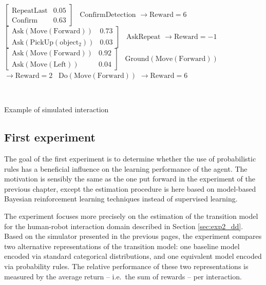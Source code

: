 \begin{Transcript}[p!]
\begin{normalsize}
\begin{dialogue}
 $\begin{bmatrix}\mathrm{RepeatLast} & 0.05 \\ \mathrm{Confirm} & 0.63 \end{bmatrix}$ \vspace{3mm}
 \ $\mathrm{ConfirmDetection}$ \hspace{34mm} $\rightarrow \mathrm{Reward} = 6$ \vspace{3mm}
 $\begin{bmatrix}\mathrm{Ask(Move(Forward))} & 0.73 \\
\mathrm{Ask(PickUp(object_2))}& 0.03 \end{bmatrix}$ \vspace{3mm}
 \ $\mathrm{AskRepeat}$ \hspace{47mm} $\rightarrow \mathrm{Reward} = -1$ \vspace{3mm}
 $\begin{bmatrix}\mathrm{Ask(Move(Forward))} & 0.92 \\
\mathrm{Ask(Move(Left))} & 0.04 \end{bmatrix}$ \vspace{3mm}
 \ $\mathrm{Ground(Move(Forward))}$ \hspace{22mm} $\rightarrow \mathrm{Reward} = 2$ \vspace{3mm}
 \ $\mathrm{Do(Move(Forward))}$ \hspace{31mm} $\rightarrow \mathrm{Reward} = 6$
\end{dialogue}
$\phantom{a}$\hspace{13mm} \vspace{3mm}
\end{normalsize}
\caption{Example of simulated interaction}
\end{Transcript}

\subsection{First experiment}

The goal of the first experiment is to determine whether the use of probabilistic rules has a beneficial influence on the learning performance of the agent. The motivation is sensibly the same as the one put forward in the experiment of the previous chapter, except the estimation procedure is here based on model-based Bayesian reinforcement learning techniques instead of supervised learning. 

The experiment focuses more precisely on the estimation of the transition model for the human-robot interaction domain described in Section \ref{sec:exp2_dd}. Based on the simulator presented in the previous pages, the experiment compares two alternative representations of the transition model: one baseline model encoded via standard categorical distributions, and one equivalent model encoded via probability rules.  The relative performance of these two representations is measured by the average return -- i.e.\ the sum of rewards -- per interaction. 

